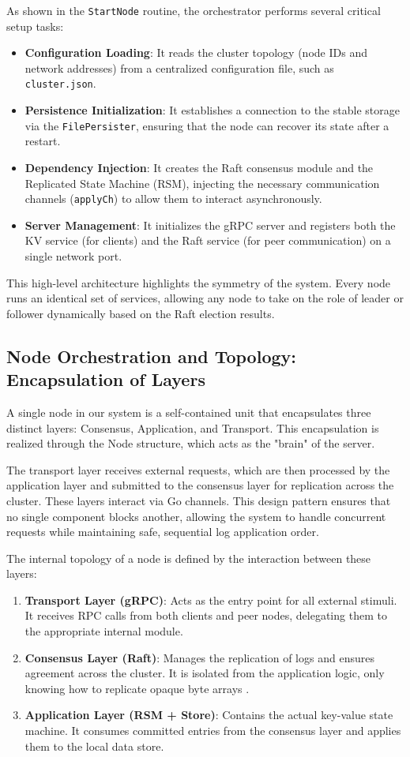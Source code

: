 As shown in the \texttt{StartNode} routine, the orchestrator performs several critical setup tasks:
\begin{itemize}
    \item \textbf{Configuration Loading}: It reads the cluster topology (node IDs and network addresses) from a centralized configuration file, such as \texttt{cluster.json}.
    \item \textbf{Persistence Initialization}: It establishes a connection to the stable storage via the \texttt{FilePersister}, ensuring that the node can recover its state after a restart.
    \item \textbf{Dependency Injection}: It creates the Raft consensus module and the Replicated State Machine (RSM), injecting the necessary communication channels (\texttt{applyCh}) to allow them to interact asynchronously.
    \item \textbf{Server Management}: It initializes the gRPC server and registers both the KV service (for clients) and the Raft service (for peer communication) on a single network port.
\end{itemize}

This high-level architecture highlights the symmetry of the system.
Every node runs an identical set of services, allowing any node to take on the role of leader or follower dynamically based on the Raft election results.

\subsection{Node Orchestration and Topology: Encapsulation of Layers}
A single node in our system is a self-contained unit that encapsulates three distinct layers: Consensus, Application, and Transport. This encapsulation is realized through the Node structure, which acts as the "brain" of the server.

The transport layer receives external requests, which are then processed by the application layer and submitted to the consensus layer for replication across the cluster. These layers interact via Go channels. This design pattern ensures that no single component blocks another, allowing the system to handle concurrent requests while maintaining safe, sequential log application order.

The internal topology of a node is defined by the interaction between these layers:
\begin{enumerate}
    \item \textbf{Transport Layer (gRPC)}: Acts as the entry point for all external stimuli. It receives RPC calls from both clients and peer nodes, delegating them to the appropriate internal module.
    \item \textbf{Consensus Layer (Raft)}: Manages the replication of logs and ensures agreement across the cluster. It is isolated from the application logic, only knowing how to replicate opaque byte arrays \cite{Raft2014}.
    \item \textbf{Application Layer (RSM + Store)}: Contains the actual key-value state machine. It consumes committed entries from the consensus layer and applies them to the local data store.
\end{enumerate}


